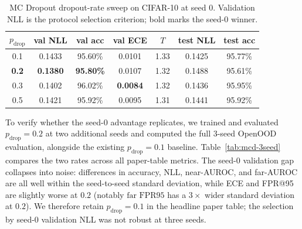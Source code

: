 \begin{table}[h]
\centering
\caption{MC Dropout dropout-rate sweep on CIFAR-10 at seed 0. Validation NLL
is the protocol selection criterion; bold marks the seed-0 winner.}
\label{tab:mcd-dropout-sweep}
\small
\begin{tabular}{c c c c c c c}
\toprule
$p_{\text{drop}}$ & val NLL & val acc & val ECE & $T$ & test NLL & test acc \\
\midrule
0.1                & 0.1433          & 95.60\%          & 0.0101          & 1.33 & 0.1425 & 95.77\% \\
\textbf{0.2}       & \textbf{0.1380} & \textbf{95.80\%} & 0.0107          & 1.32 & 0.1488 & 95.61\% \\
0.3                & 0.1402          & 96.02\%          & \textbf{0.0084} & 1.32 & 0.1436 & 95.95\% \\
0.5                & 0.1421          & 95.92\%          & 0.0095          & 1.31 & 0.1441 & 95.92\% \\
\bottomrule
\end{tabular}
\end{table}

To verify whether the seed-0 advantage replicates, we trained and evaluated
$p_{\text{drop}} = 0.2$ at two additional seeds and computed the full 3-seed
OpenOOD evaluation, alongside the existing $p_{\text{drop}} = 0.1$ baseline.
Table~\ref{tab:mcd-3seed} compares the two rates across all paper-table
metrics. The seed-0 validation gap collapses into noise: differences in
accuracy, NLL, near-AUROC, and far-AUROC are all well within the seed-to-seed
standard deviation, while ECE and FPR@95 are slightly worse at $0.2$ (notably
$\text{far FPR95}$ has a $3\times$ wider standard deviation at $0.2$).
We therefore retain $p_{\text{drop}} = 0.1$ in the headline paper table; the
selection by seed-0 validation NLL was not robust at three seeds.

